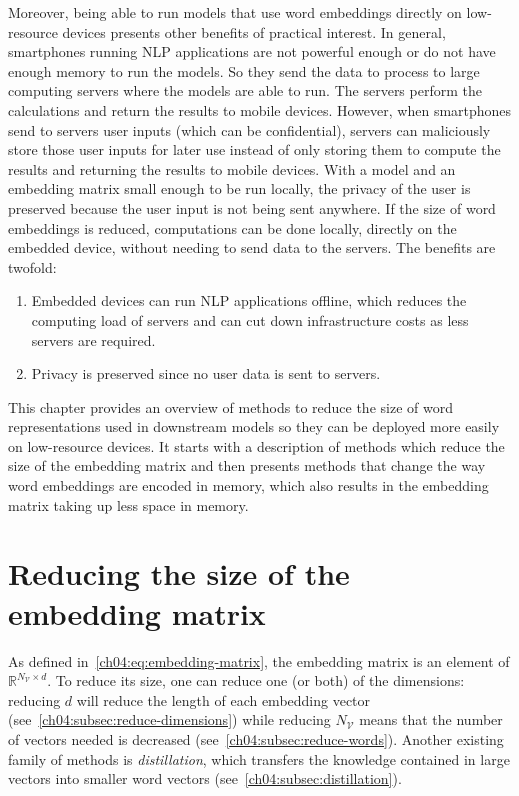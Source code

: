   Moreover, being able to run models that use word embeddings directly on
  low-resource devices presents other benefits of practical interest. In
  general, smartphones running NLP applications are not powerful enough or do
  not have enough memory to run the models. So they send the data to process to
  large computing servers where the models are able to run. The servers perform
  the calculations and return the results to mobile devices. However, when
  smartphones send to servers user inputs (which can be confidential), servers
  can maliciously store those user inputs for later use instead of only storing
  them to compute the results and returning the results to mobile devices. With
  a model and an embedding matrix small enough to be run locally, the privacy of
  the user is preserved because the user input is not being sent anywhere. If
  the size of word embeddings is reduced, computations can be done locally,
  directly on the embedded device, without needing to send data to the servers.
  The benefits are twofold:
  \begin{enumerate}
    \item Embedded devices can run NLP applications offline, which reduces the
      computing load of servers and can cut down infrastructure costs as less
      servers are required.
    \item Privacy is preserved since no user data is sent to servers.
  \end{enumerate}
  This chapter provides an overview of methods to reduce the size of word
  representations used in downstream models so they can be deployed more easily
  on low-resource devices. It starts with a description of methods which reduce
  the size of the embedding matrix and then presents methods that change the way
  word embeddings are encoded in memory, which also results in the embedding
  matrix taking up less space in memory.

\section{Reducing the size of the embedding matrix}
  As defined in~\autoref{ch04:eq:embedding-matrix}, the embedding matrix is an
  element of $\mathbb{R}^{N_\mathcal{V} \times d}$. To reduce its size, one can
  reduce one (or both) of the dimensions: reducing $d$ will reduce the length of
  each embedding vector (see~\autoref{ch04:subsec:reduce-dimensions}) while
  reducing $N_\mathcal{V}$ means that the number of vectors needed is decreased
  (see~\autoref{ch04:subsec:reduce-words}). Another existing family of methods
  is \textit{distillation}, which transfers the knowledge contained in large
  vectors into smaller word vectors (see~\autoref{ch04:subsec:distillation}).

